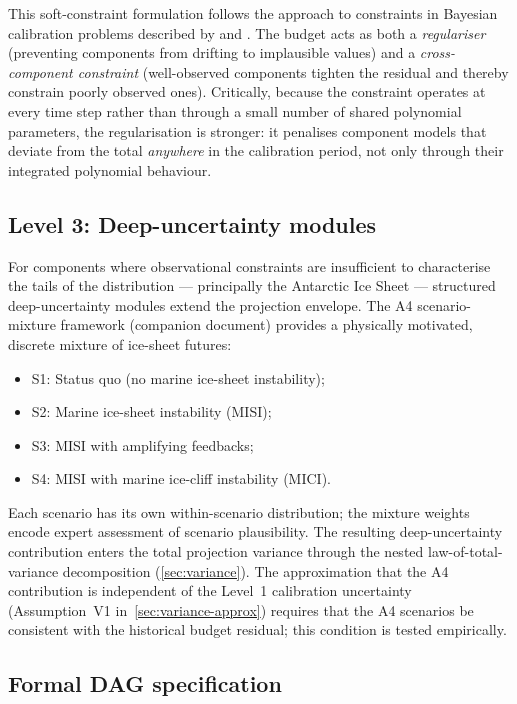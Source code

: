 \documentclass[11pt]{article}
\begin{document}
This soft-constraint formulation follows the approach to constraints in Bayesian calibration problems described by \citet{kennedy2001bayesian} and \citet{brynjarsdottir2014learning}.  The budget acts as both a \emph{regulariser} (preventing components from drifting to implausible values) and a \emph{cross-component constraint} (well-observed components tighten the residual and thereby constrain poorly observed ones).  Critically, because the constraint operates at every time step rather than through a small number of shared polynomial parameters, the regularisation is stronger: it penalises component models that deviate from the total \emph{anywhere} in the calibration period, not only through their integrated polynomial behaviour.

\subsection{Level 3: Deep-uncertainty modules}

For components where observational constraints are insufficient to characterise the tails of the distribution --- principally the Antarctic Ice Sheet --- structured deep-uncertainty modules extend the projection envelope.  The A4 scenario-mixture framework (companion document) provides a physically motivated, discrete mixture of ice-sheet futures:
\begin{itemize}
  \item S1: Status quo (no marine ice-sheet instability);
  \item S2: Marine ice-sheet instability (MISI);
  \item S3: MISI with amplifying feedbacks;
  \item S4: MISI with marine ice-cliff instability (MICI).
\end{itemize}
Each scenario has its own within-scenario distribution; the mixture weights encode expert assessment of scenario plausibility.  The resulting deep-uncertainty contribution enters the total projection variance through the nested law-of-total-variance decomposition (\cref{sec:variance}).  The approximation that the A4 contribution is independent of the Level~1 calibration uncertainty (Assumption~V1 in~\cref{sec:variance-approx}) requires that the A4 scenarios be consistent with the historical budget residual; this condition is tested empirically.

\subsection{Formal DAG specification}
\label{sec:dag-spec}
\end{document}
